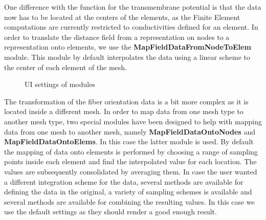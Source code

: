 \documentclass[fleqn,11pt,openany]{book}
\begin{document}
One difference with the function for the transmembrane potential is that the data now has to be located at the centers of the elements, as the Finite Element computations are currently restricted to conductivities defined for an element. In order to translate the distance field from a representation on nodes to a representation onto elements, we use the {\bf MapFieldDataFromNodeToElem} module. This module by default interpolates the data using a linear scheme to the center of each element of the mesh. 

\begin{figure}
\caption{UI settings of modules}\label{fig:BuildSimulationModel4}
\end{figure}

The transformation of the fiber orientation data is a bit more complex as it is located inside a different mesh. In order to map data from one mesh type to another mesh type, two special modules have been designed to help with mapping data from one mesh to another mesh, namely {\bf MapFieldDataOntoNodes} and {\bf MapFieldDataOntoElems}. In this case the latter module is used. By default the mapping of data onto elements is performed by choosing a range of sampling points inside each element and find the interpolated value for each location. The values are subsequently consolidated by averaging them. In case the user wanted a different integration scheme for the data, several methods are available for defining the data in the original, a variety of sampling schemes is available and several methods are available for combining the resulting values. In this case we use the default settings as they should render a good enough result.
\end{document}
